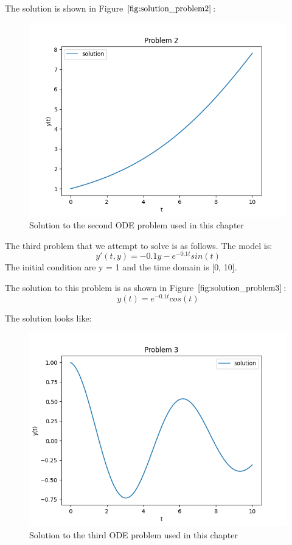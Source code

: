 \documentclass{article}
\begin{document}
The solution is shown in Figure $\ref{fig:solution_problem2}$:
\begin{figure}[H]
\centering
\includegraphics[width=0.7\linewidth]{./figures/solution_problem2}
\caption{Solution to the second ODE problem used in this chapter}
\label{fig:solution_problem2}
\end{figure}

The third problem that we attempt to solve is as follows.
The model is:
\begin{equation}
y'(t, y) = -0.1y - e^{-0.1t}sin(t)
\end{equation}
The initial condition are y = 1 and the time domain is [0, 10].

The solution to this problem is as shown in Figure $\ref{fig:solution_problem3}$:
\begin{equation}
y(t) = e^{-0.1t}cos(t)
\end{equation}

The solution looks like:
\begin{figure}[H]
\centering
\includegraphics[width=0.7\linewidth]{./figures/solution_problem3}
\caption{Solution to the third ODE problem used in this chapter}
\label{fig:solution_problem3}
\end{figure}
\end{document}

